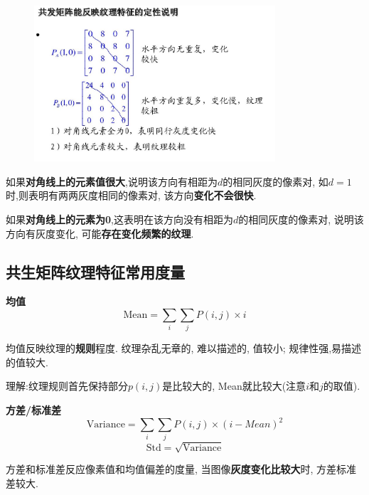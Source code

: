 \begin{figure}[hbpt]
  \centering
  \includegraphics[width=0.8\textwidth]{图像分析的数据结构/Figures/共生矩阵解释}
\end{figure}

如果\textbf{\color{magenta}对角线上的元素值很大},说明该方向有相距为$d$的相同灰度的像素对,%
如$d=1$时,则表明有两两灰度相同的像素对,%
该方向\textbf{\color{magenta}变化不会很快}.

如果\textbf{\color{magenta}对角线上的元素为0},这表明在该方向没有相距为$d$的相同灰度的像素对,%
说明该方向有灰度变化,%
可能\textbf{\color{magenta}存在变化频繁的纹理}.

\subsection{共生矩阵纹理特征常用度量}
\noindent{}\textbf{\color{magenta}均值}
\begin{equation}
  \text{Mean} = \sum_{i}{\sum_{j}{P(i,j) \times i}}
\end{equation}

均值反映纹理的\textbf{\color{magenta}规则}程度.%
纹理杂乱无章的,%
难以描述的,%
值较小;%
规律性强,易描述的值较大.%

理解:纹理规则首先保持部分$p(i,j)$是比较大的,%
Mean就比较大(注意$i$和$j$的取值).

\noindent{}\textbf{\color{magenta}方差/标准差}
\begin{equation}
  \text{Variance}   = \sum_{i}{\sum_{j}P(i,j) \times (i-Mean)^{2}}
\end{equation}
\begin{equation}
  \text{Std} = \sqrt{\text{Variance}}
\end{equation}

方差和标准差反应像素值和均值偏差的度量,%
当图像\textbf{\color{magenta}灰度变化比较大}时,%
方差标准差较大.%

